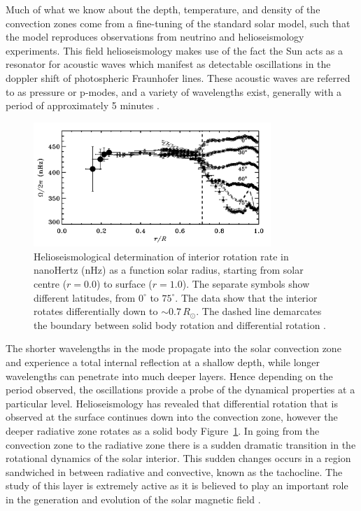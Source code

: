 Much of what we know about the depth, temperature, and density of the convection zones come from a fine-tuning of the standard solar model, such that the model reproduces observations from neutrino and helioseismology experiments. This field helioseismology makes use of the fact the Sun acts as a resonator for acoustic waves which manifest as detectable oscillations in the doppler shift of photospheric Fraunhofer lines. These acoustic waves are referred to as pressure or p-modes, and a variety of wavelengths exist, generally with a period of approximately 5 minutes \citep{turk2011}. 

\begin{figure}[!t]
\begin{center}
\includegraphics[trim = 0cm 0.5cm 0cm 0cm, width=0.8\textwidth]{images/differential_rot.png}
\caption[Differential rotation rate as a function of latitude and depth]{Helioseismological determination of interior rotation rate in nanoHertz (nHz) as a function solar radius, starting from solar centre ($r=0.0$) to surface ($r=1.0$). The separate symbols show different latitudes, from $0^{\circ}$ to $75^{\circ}$. The data show that the interior rotates differentially down to $\sim$$0.7\,R_{\odot}$. The dashed line demarcates the boundary between solid body rotation and differential rotation \citep{thompson2003}.}
\label{fig:diff_rot} 
\end{center}
\end{figure}

The shorter wavelengths in the mode propagate into the solar convection zone and experience a total internal reflection at a shallow depth, while longer wavelengths can penetrate into much deeper layers. Hence depending on the period observed, the oscillations provide a probe of the dynamical properties at a particular level. Helioseismology has revealed that differential rotation that is observed at the surface continues down into the convection zone, however the deeper radiative zone rotates as a solid body Figure~\ref{fig:diff_rot}. In going from the convection zone to the radiative zone there is a sudden dramatic transition in the rotational dynamics of the solar interior. This sudden changes occurs in a region sandwiched in between radiative and convective, known as the tachocline. The study of this layer is extremely active as it is believed to play an important role in the generation and evolution of the solar magnetic field \citep{thompson2003}.


